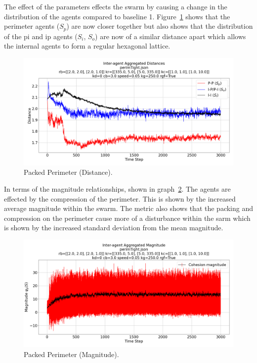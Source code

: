 \documentclass[12pt,a4paper]{IEEEtran}
\begin{document}
The effect of the parameters effects the swarm by causing a change in the distribution of the agents compared to baseline 1. Figure~\ref{fig:tightPerimDistance} shows that the perimeter agents ($S_{p}$) are now closer together but also shows that the distribution of the p\textrightarrow i and i\textrightarrow p agents ($S_{i}$, $S_{o}$) are now of a similar distance apart which allows the internal agents to form a regular hexagonal lattice.

\begin{figure}[H]
	\begin{center}
		\includegraphics[width=1.0\linewidth]{figures/tightPerimDistance}
	\end{center}
	\caption{Packed Perimeter (Distance). \label{fig:tightPerimDistance}}
\end{figure}

In terms of the magnitude relationships, shown in graph~\ref{fig:tightPerimMagnitude}. The agents are effected by the compression of the perimeter. This is shown by the increased average magnitude within the swarm. The metric also shows that the packing and compression on the perimeter cause more of a disturbance within the sarm which is shown by the increased standard deviation from the mean magnitude.

\begin{figure}[H]
	\begin{center}
		\includegraphics[width=1.0\linewidth]{figures/tightPerimMagnitude}
	\end{center}
	\caption{Packed Perimeter (Magnitude). \label{fig:tightPerimMagnitude}}
\end{figure}
\end{document}
